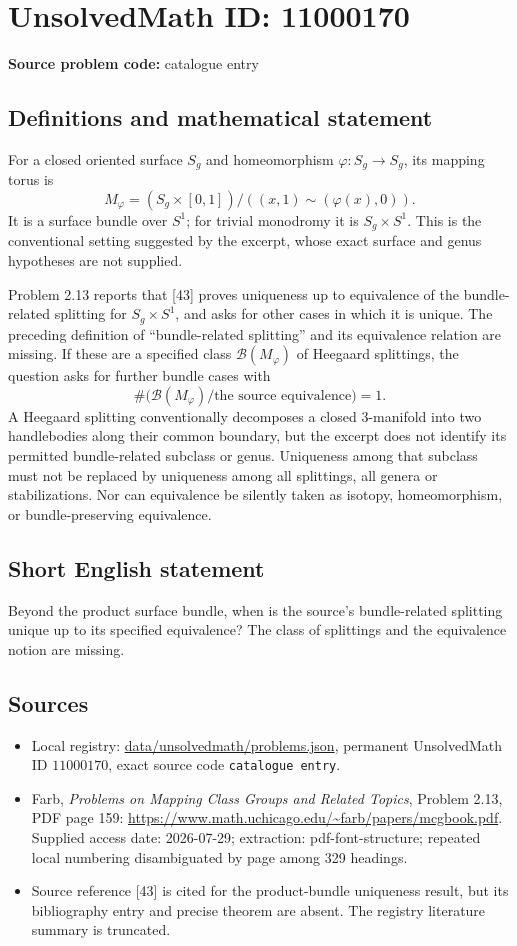 \documentclass[11pt]{article}
\begin{document}
\section*{UnsolvedMath ID: 11000170}
\textbf{Source problem code:} catalogue entry
\subsection{Definitions and mathematical statement}
For a closed oriented surface $S_g$ and homeomorphism $\varphi:S_g\to S_g$, its mapping torus is
\[
 M_\varphi=(S_g\times[0,1])/((x,1)\sim(\varphi(x),0)).
\]
It is a surface bundle over $S^1$; for trivial monodromy it is $S_g\times S^1$. This is the conventional setting suggested by the excerpt, whose exact surface and genus hypotheses are not supplied.

Problem 2.13 reports that [43] proves uniqueness up to equivalence of the bundle-related splitting for $S_g\times S^1$, and asks for other cases in which it is unique. The preceding definition of ``bundle-related splitting'' and its equivalence relation are missing. If these are a specified class $\mathcal B(M_\varphi)$ of Heegaard splittings, the question asks for further bundle cases with
\[
 \#\bigl(\mathcal B(M_\varphi)/\text{the source equivalence}\bigr)=1.
\]
A Heegaard splitting conventionally decomposes a closed $3$-manifold into two handlebodies along their common boundary, but the excerpt does not identify its permitted bundle-related subclass or genus. Uniqueness among that subclass must not be replaced by uniqueness among all splittings, all genera or stabilizations. Nor can equivalence be silently taken as isotopy, homeomorphism, or bundle-preserving equivalence.
\subsection{Short English statement}
Beyond the product surface bundle, when is the source's bundle-related splitting unique up to its specified equivalence? The class of splittings and the equivalence notion are missing.
\subsection{Sources}
\begin{itemize}
\item Local registry: \url{data/unsolvedmath/problems.json}, permanent UnsolvedMath ID $11000170$, exact source code \texttt{catalogue entry}.
\item Farb, \emph{Problems on Mapping Class Groups and Related Topics}, Problem 2.13, PDF page 159: \url{https://www.math.uchicago.edu/~farb/papers/mcgbook.pdf}. Supplied access date: 2026-07-29; extraction: pdf-font-structure; repeated local numbering disambiguated by page among 329 headings.
\item Source reference [43] is cited for the product-bundle uniqueness result, but its bibliography entry and precise theorem are absent. The registry literature summary is truncated.
\end{itemize}
\end{document}
